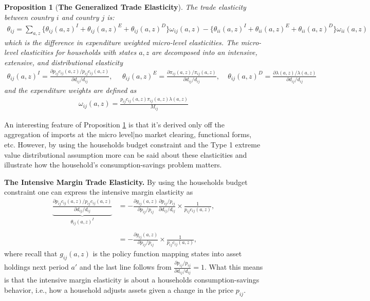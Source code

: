 \documentclass[12pt,pdftex]{article}
\newtheorem{prp}{Proposition}
\begin{document}
\begin{onehalfspacing}
\begin{prp}[\textbf{The Generalized Trade Elasticity}] \label{apx-prp:GET} The trade elasticity between country $i$ and country $j$ is:
{\footnotesize
\begin{align}
\theta_{ij} = \sum_{a,z} \bigg \{ \theta_{ij}(a,z)^{I} + \theta_{ij}(a,z)^{E} + \theta_{ij}(a,z)^{D} \bigg \}\omega_{ij}(a,z) - \bigg \{ \theta_{ii}(a,z)^{I} + \theta_{ii}(a,z)^{E} + \theta_{ii}(a,z)^{D} \bigg \}\omega_{ii}(a,z)
\label{eq:apx-trade-elasticity}
\end{align}
}which is the difference in expenditure weighted micro-level elasticities. The micro-level elasticities for households with states $a,z$ are decomposed into an intensive, extensive, and distributional elasticity
{\footnotesize
\begin{align}
\nonumber
\theta_{ij}(a,z)^{I} = \frac{\partial p_{ij}c_{ij}(a,z)/ p_{ij}c_{ij}(a,z)}{\partial d_{ij} / d_{ij}}, \ \ \ \ \ \ \theta_{ij}(a,z)^{E} = \frac{\partial \pi_{ij}(a,z) / \pi_{ij}(a,z)}{\partial d_{ij} / d_{ij}}, \ \ \ \ \
\theta_{ij}(a,z)^{D} = \frac{\partial \lambda(a,z) / \lambda(a,z)}{\partial d_{ij} / d_{ij}}
\end{align}
}
and the expenditure weights are defined as
{\footnotesize
\begin{align}
\nonumber
\omega_{ij}(a,z) = \frac{p_{ij}c_{ij}(a,z)\pi_{ij}(a,z) \lambda(a,z)}{M_{ij}}
\end{align}
}
\end{prp}
An interesting feature of Proposition \ref{apx-prp:GET} is that it's derived only off the aggregation of imports at the micro level|no market clearing, functional forms, etc. However, by using the households budget constraint and the Type 1 extreme value distributional assumption more can be said about these elasticities and illustrate how the household's consumption-savings problem matters.

\textbf{The Intensive Margin Trade Elasticity.} By using the households budget constraint one can express the intensive margin elasticity as
\begin{align}
\underbrace{\frac{\partial p_{ij}c_{ij}(a,z)/ p_{ij}c_{ij}(a,z)}{\partial d_{ij} / d_{ij}}}_{\theta_{ij}(a,z)^{I}} &= -\frac{\partial g_{ij}(a,z)}{\partial p_{ij}/ p_{ij}} \frac{ \partial p_{ij}/ p_{ij}}{\partial d_{ij}/ d_{ij}} \times \frac{1}{p_{ij}c_{ij}(a,z)}, \\
\nonumber \\
&= -\frac{\partial g_{ij}(a,z)}{\partial p_{ij}/ p_{ij}} \times \frac{1}{p_{ij}c_{ij}(a,z)},
\label{eq:apx-intensive-margin}
\end{align}
where recall that $g_{ij}(a,z)$ is the policy function mapping states into asset holdings next period $a'$ and the last line follows from $\frac{ \partial p_{ij}/ p_{ij}}{\partial d_{ij}/ d_{ij}} = 1$. What this means is that the intensive margin elasticity is about a households consumption-savings behavior, i.e., how a household adjusts assets given a change in the price $p_{ij}$.


\end{onehalfspacing}
\end{document}
